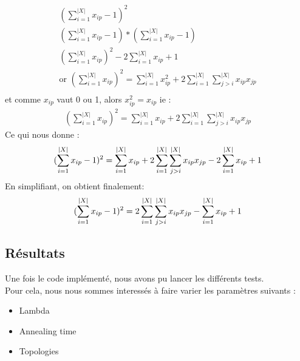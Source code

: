 \documentclass{article}
\begin{document}
        \begin{equation*}
            \begin{aligned}
            (\sum_{i=1}^{|X|}x_{ip} -1)^{2} \\ (\sum_{i=1}^{|X|}x_{ip} -1) *(\sum_{i=1}^{|X|}x_{ip} -1)\\
            (\sum_{i=1}^{|X|}x_{ip})^2 - 2 \sum_{i=1}^{|X|}x_{ip} +1\\
            \text{or  } (\sum_{i=1}^{|X|}x_{ip})^2 = \sum_{i=1}^{|X|}x_{ip}^2 + 2 \sum_{i=1}^{|X|}\sum_{j>i}^{|X|}x_{ip}x_{jp}\\
            \end{aligned}
        \end{equation*}
        et comme $x_{ip}$ vaut 0 ou 1, alors $x_{ip}^{2}=x_{ip}$ ie :\\
        \begin{equation*}
            \begin{aligned}
            (\sum_{i=1}^{|X|}x_{ip})^2 = \sum_{i=1}^{|X|}x_{ip} + 2 \sum_{i=1}^{|X|}\sum_{j>i}^{|X|}x_{ip}x_{jp}
            \end{aligned}
        \end{equation*}
        Ce qui nous donne :
        \begin{equation*}
        (\sum_{i=1}^{|X|}x_{ip} -1)^{2} = \sum_{i=1}^{|X|}x_{ip} + 2 \sum_{i=1}^{|X|}\sum_{j>i}^{|X|}x_{ip}x_{jp}\\ - 2 \sum_{i=1}^{|X|}x_{ip} +1\\
        \end{equation*}
        En simplifiant, on obtient finalement:
        \begin{equation*}
        (\sum_{i=1}^{|X|}x_{ip} -1)^{2} =  2 \sum_{i=1}^{|X|}\sum_{j>i}^{|X|}x_{ip}x_{jp}\\ -  \sum_{i=1}^{|X|}x_{ip} +1\\
        \end{equation*}



        \subsection{Résultats}\label{subsec:resultats}
        Une fois le code implémenté, nous avons pu lancer les différents tests.\\
        Pour cela, nous nous sommes interessés à faire varier les paramètres suivants :
        \begin{itemize}
            \item Lambda
            \item Annealing time
            \item Topologies
        \end{itemize}
\end{document}
